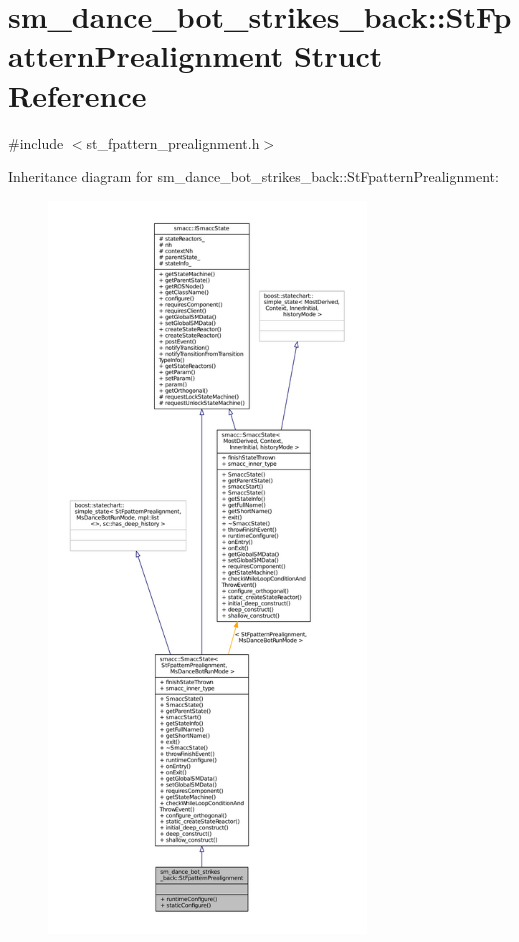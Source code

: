 \hypertarget{structsm__dance__bot__strikes__back_1_1StFpatternPrealignment}{}\section{sm\+\_\+dance\+\_\+bot\+\_\+strikes\+\_\+back\+:\+:St\+Fpattern\+Prealignment Struct Reference}
\label{structsm__dance__bot__strikes__back_1_1StFpatternPrealignment}


{\ttfamily \#include $<$st\+\_\+fpattern\+\_\+prealignment.\+h$>$}



Inheritance diagram for sm\+\_\+dance\+\_\+bot\+\_\+strikes\+\_\+back\+:\+:St\+Fpattern\+Prealignment\+:
\nopagebreak
\begin{figure}[H]
\begin{center}
\leavevmode
\includegraphics[height=550pt]{structsm__dance__bot__strikes__back_1_1StFpatternPrealignment__inherit__graph}
\end{center}
\end{figure}


